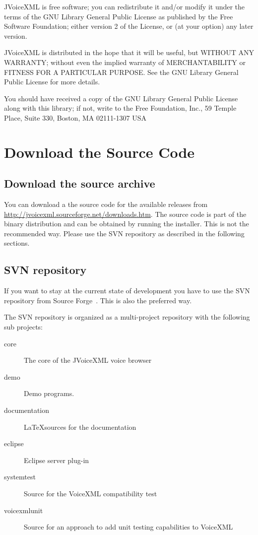 \documentclass[11pt,a4paper]{article}
\begin{document}
JVoiceXML is free software; you can redistribute it and/or
modify it under the terms of the GNU Library General Public
License as published by the Free Software Foundation; either
version 2 of the License, or (at your option) any later version.

JVoiceXML is distributed in the hope that it will be useful,
but WITHOUT ANY WARRANTY; without even the implied warranty of
MERCHANTABILITY or FITNESS FOR A PARTICULAR PURPOSE. See the GNU
Library General Public License for more details.

You should have received a copy of the GNU Library General Public
License along with this library; if not, write to the Free
Foundation, Inc., 59 Temple Place, Suite 330, Boston, MA  02111-1307  USA

\section{Download the Source Code}

\subsection{Download the source archive}

You can download a the source code for the available releases from 
\url{http://jvoicexml.sourceforge.net/downloads.htm}. The source code is part of
the binary distribution and can be obtained by running the installer. This is
not the recommended way. Please use the SVN repository as described in
the following sections. \\

\subsection{SVN repository}
\label{sec:svn-repository}

If you want to stay at the current state of development you have to use
the SVN repository from Source Forge~\cite{sourceforge}.
This is also the preferred way.

The SVN repository is organized as a multi-project repository with the following
sub projects:
\begin{description}
\item[core] The core of the JVoiceXML voice browser
\item[demo] Demo programs.
\item[documentation] \LaTeX sources for the documentation
\item[eclipse] Eclipse server plug-in
\item[systemtest] Source for the VoiceXML compatibility test
\item[voicexmlunit] Source for an approach to add unit testing capabilities to VoiceXML
\end{description}
\end{document}
